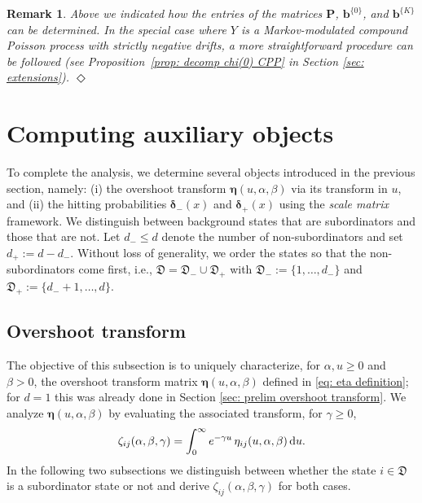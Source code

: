 \documentclass[reqno,12pt]{amsart}
\newcommand{\bs}{\boldsymbol}
\newcommand{\defD}{{\mathfrak D}}
\newcommand{\defDmin}{{\mathfrak D}_-}
\newcommand{\defDplus}{{\mathfrak D}_+}
\newtheorem{remark}{Remark}
\begin{document}
\begin{remark}\label{rem: chis}
    {\em Above we indicated how the entries of the matrices ${\bs P}$, ${\bs b}^{\{0\}}$, and ${\bs b}^{\{K\}}$ can be determined. In the special case where $Y$ is a Markov-modulated compound Poisson process with strictly negative drifts, a more straightforward procedure can be followed (see Proposition~\ref{prop: decomp chi(0) CPP} in Section \ref{sec: extensions}).} \hfill$\Diamond$
\end{remark}


\section{Computing auxiliary objects}\label{sec: aux}
To complete the analysis, we determine several objects introduced in the previous section, namely: (i) the overshoot transform $\bs\eta(u,\alpha,\beta)$ via its transform in $u$, and (ii) the hitting probabilities $\bs\delta_{-}(x)$ and $\bs\delta_{+}(x)$ using the \emph{scale matrix} framework.  
We distinguish between background states that are subordinators and those that are not. Let $d_- \leqslant d$ denote the number of non-subordinators and set $d_+ := d-d_-$. Without loss of generality, we order the states so that the non-subordinators come first, i.e., $\defD =\defDmin \cup\defDplus$ with $\defDmin :=\{1,\ldots,d_-\}$ and $\defDplus :=\{d_-+1,\ldots,d\}$.


\subsection{Overshoot transform}\label{sec: overshoot transform} 
The objective of this subsection is to uniquely characterize, for $\alpha,u\geqslant 0$ and $\beta>0$, the overshoot transform matrix $\bs\eta(u,\alpha,\beta)$ defined in \eqref{eq: eta definition}; for $d=1$ this was already done in Section \ref{sec: prelim overshoot transform}.
We analyze $\bs\eta(u,\alpha,\beta)$ by evaluating the associated transform, for $\gamma\geqslant 0$,
\begin{equation*}
    \zeta_{ij}(\alpha,\beta,\gamma) = \int_0^\infty e^{-\gamma u} \,\eta_{ij}(u,\alpha,\beta)\,{\rm d}u.
\end{equation*}
In the following two subsections we distinguish between whether the state $i\in\defD $ is a subordinator state or not and derive $\zeta_{ij}(\alpha, \beta, \gamma)$ for both cases. 
\end{document}
